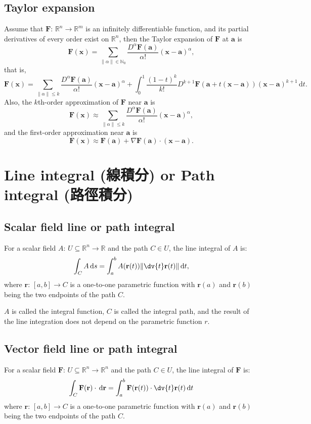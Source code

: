 \documentclass[a4paper,12pt]{report}
\begin{document}
\subsection{Taylor expansion}
Assume that $\mathbf{F}:\,\mathbb{R}^n\to\mathbb{R}^m$ is an infinitely differentiable function, and its partial derivatives of every order exist on $\mathbb{R}^n$, then the Taylor expansion of $\mathbf{F}$ at $\mathbf{a}$ is
\[\mathbf{F}(\mathbf{x}) = \sum_{\|\alpha\|\in\mathbb{N}_0} \frac{D^\alpha \mathbf{F}(\mathbf{a})}{\alpha!} (\mathbf{x} - \mathbf{a})^\alpha,\]
that is,
\[\mathbf{F}(\mathbf{x}) = \sum_{\|\alpha\|\leq k} \frac{D^\alpha \mathbf{F}(\mathbf{a})}{\alpha!} (\mathbf{x} - \mathbf{a})^\alpha+\int_0^1\frac{(1-t)^k}{k!} D^{k+1}\mathbf{F}(\mathbf{a} + t(\mathbf{x} - \mathbf{a})) (\mathbf{x} - \mathbf{a})^{k+1} \, \mathrm{d}t.\]
Also, the $k$th-order approximation of $\mathbf{F}$ near $\mathbf{a}$ is
\[\mathbf{F}(\mathbf{x}) \approx \sum_{\|\alpha\|\leq k} \frac{D^\alpha \mathbf{F}(\mathbf{a})}{\alpha!} (\mathbf{x} - \mathbf{a})^\alpha,\]
and the first-order approximation near $\mathbf{a}$ is
\[\mathbf{F}(\mathbf{x}) \approx \mathbf{F}(\mathbf{a}) + \nabla \mathbf{F}(\mathbf{a}) \cdot (\mathbf{x} - \mathbf{a}).\]



\section{Line integral (線積分) or Path integral (路徑積分)}
\subsection{Scalar field line or path integral}
For a scalar field $A : \,U\subseteq \mathbb {R} ^{n}\to \mathbb {R}$ and the path $C \in U$, the line integral of $A$ is: 
\[\int _{C}A\,\mathrm {d} s=\int _{a}^{b}A(\mathbf{r}(t))\|\dv{t}\mathbf {r} (t)\|\,\mathrm {d} t,\]
where $\mathbf{r}:\, [a, b] \to C$ is a one-to-one parametric function with $\mathbf{r}(a)$ and $\mathbf{r}(b)$ being the two endpoints of the path $C$. 

$A$ is called the integral function, $C$ is called the integral path, and the result of the line integration does not depend on the parametric function $r$.
\subsection{Vector field line or path integral}
For a scalar field $\mathbf{F}: \,U\subseteq \mathbb {R} ^{n}\to \mathbb {R}^n$ and the path $C \in U$, the line integral of $\mathbf{F}$ is: 
\[\int _{C}\mathbf {F} (\mathbf {r} )\cdot \,\mathrm {d} \mathbf{r}=\int _{a}^{b}\mathbf {F} (\mathbf {r} (t))\cdot \dv{t}\mathbf {r} (t)\,\mathrm {d} t\]
where $\mathbf{r}:\, [a, b] \to C$ is a one-to-one parametric function with $\mathbf{r}(a)$ and $\mathbf{r}(b)$ being the two endpoints of the path $C$. 
\end{document}
